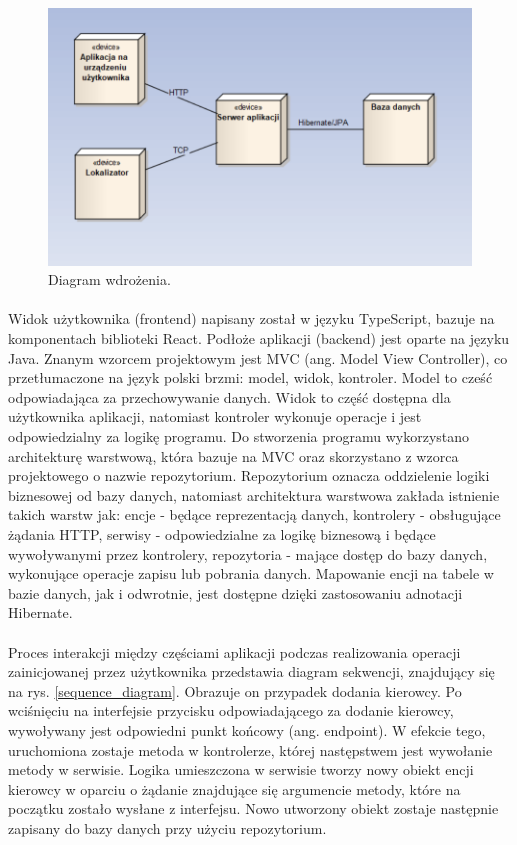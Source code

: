 \begin{figure}
	\centering
	\includegraphics[width=1\textwidth]{./graf/deployment_diagram.png}
	\caption{Diagram wdrożenia.}
	\label{deployment_diagram}
\end{figure}

\paragraph{}
Widok użytkownika (frontend) napisany został w języku TypeScript, bazuje na komponentach biblioteki React. Podłoże aplikacji (backend) jest oparte na języku Java. Znanym wzorcem projektowym jest MVC (ang. Model View Controller), co przetłumaczone na język polski brzmi: model, widok, kontroler. Model to cześć odpowiadająca za przechowywanie danych. Widok to część dostępna dla użytkownika aplikacji, natomiast kontroler wykonuje operacje i jest odpowiedzialny za logikę programu. Do stworzenia programu wykorzystano architekturę warstwową, która bazuje na MVC oraz skorzystano z wzorca projektowego o nazwie repozytorium. Repozytorium oznacza oddzielenie logiki biznesowej od bazy danych, natomiast architektura warstwowa zakłada istnienie takich warstw jak: encje - będące reprezentacją danych, kontrolery - obsługujące żądania HTTP, serwisy - odpowiedzialne za logikę biznesową i będące wywoływanymi przez kontrolery, repozytoria - mające dostęp do bazy danych, wykonujące operacje zapisu lub pobrania danych. Mapowanie encji na tabele w bazie danych, jak i odwrotnie, jest dostępne dzięki zastosowaniu adnotacji Hibernate.

\paragraph{}
Proces interakcji między częściami aplikacji podczas realizowania operacji zainicjowanej przez użytkownika przedstawia diagram sekwencji, znajdujący się na rys. \ref{sequence_diagram}. Obrazuje on przypadek dodania kierowcy. Po wciśnięciu na interfejsie przycisku odpowiadającego za dodanie kierowcy, wywoływany jest odpowiedni punkt końcowy (ang. endpoint). W efekcie tego, uruchomiona zostaje metoda w kontrolerze, której następstwem jest wywołanie metody w serwisie. Logika umieszczona w serwisie tworzy nowy obiekt encji kierowcy w oparciu o żądanie znajdujące się argumencie metody, które na początku zostało wysłane z interfejsu. Nowo utworzony obiekt zostaje następnie zapisany do bazy danych przy użyciu repozytorium.

